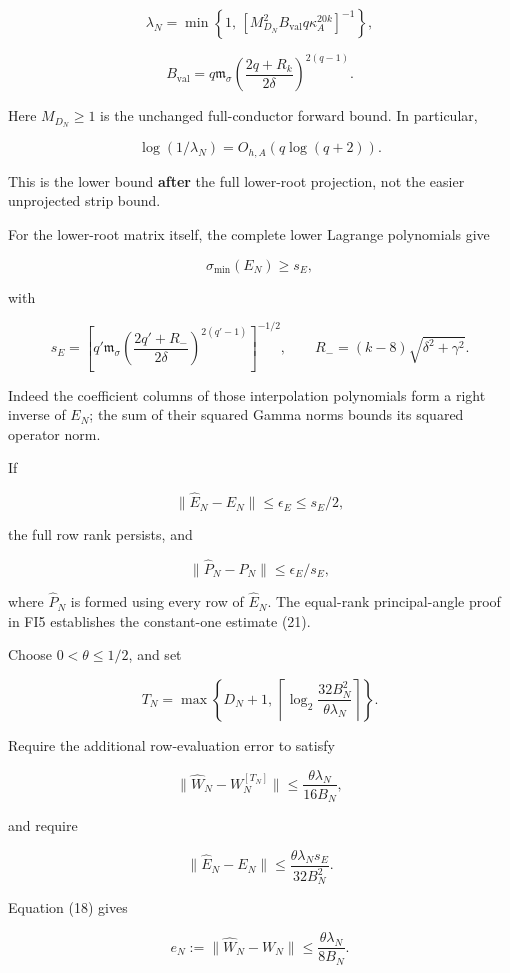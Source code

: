 \documentclass[11pt]{article}
\begin{document}
\[
\boxed{
\lambda_N
=
\min\left\{
1,\,
\left[
M_{D_N}^2 B_{\mathrm{val}}q\kappa_A^{20k}
\right]^{-1}
\right\},
}
\tag{19}
\]

\[
B_{\mathrm{val}}
=
q\mathfrak m_\sigma
\left(\frac{2q+R_k}{2\delta}\right)^{2(q-1)}.
\]

Here \(M_{D_N}\ge1\) is the unchanged full-conductor forward bound. In particular,

\[
\log(1/\lambda_N)=O_{h,A}(q\log(q+2)).
\]

This is the lower bound \textbf{after} the full lower-root projection, not the easier unprojected strip bound.

For the lower-root matrix itself, the complete lower Lagrange polynomials give

\[
\sigma_{\min}(E_N)\ge s_E,
\]

with

\[
\boxed{
s_E=
\left[
q'\mathfrak m_\sigma
\left(\frac{2q'+R_-}{2\delta}\right)^{2(q'-1)}
\right]^{-1/2},
\qquad
R_-=(k-8)\sqrt{\delta^2+\gamma^2}.
}
\tag{20}
\]

Indeed the coefficient columns of those interpolation polynomials form a right inverse of \(E_N\); the sum of their squared Gamma norms bounds its squared operator norm.

If

\[
\|\widehat E_N-E_N\|\le\epsilon_E\le s_E/2,
\]

the full row rank persists, and

\[
\boxed{
\|\widehat P_N-P_N\|\le\epsilon_E/s_E,
}
\tag{21}
\]

where \(\widehat P_N\) is formed using every row of \(\widehat E_N\). The equal-rank principal-angle proof in FI5 establishes the constant-one estimate (21).

Choose \(0<\theta\le1/2\), and set

\[
\boxed{
T_N=
\max\left\{
D_N+1,\,
\left\lceil
\log_2\frac{32B_N^2}{\theta\lambda_N}
\right\rceil
\right\}.
}
\tag{22}
\]

Require the additional row-evaluation error to satisfy

\[
\|\widehat W_N-W_N^{[T_N]}\|
\le\frac{\theta\lambda_N}{16B_N},
\]

and require

\[
\boxed{
\|\widehat E_N-E_N\|
\le
\frac{\theta\lambda_Ns_E}{32B_N^2}.
}
\tag{23}
\]

Equation (18) gives

\[
e_N:=\|\widehat W_N-W_N\|
\le\frac{\theta\lambda_N}{8B_N}.
\]
\end{document}
